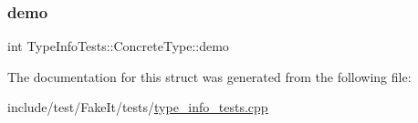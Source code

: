 \subsubsection{\texorpdfstring{demo}{demo}}
{\footnotesize\ttfamily int Type\+Info\+Tests\+::\+Concrete\+Type\+::demo}



The documentation for this struct was generated from the following file\+:\begin{DoxyCompactItemize}
\item 
include/test/\+Fake\+It/tests/\mbox{\hyperlink{type__info__tests_8cpp}{type\+\_\+info\+\_\+tests.\+cpp}}\end{DoxyCompactItemize}
